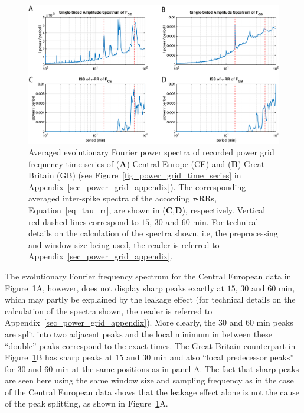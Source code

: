 \documentclass[entropy,article,accept,pdftex,moreauthors]{Definitions/mdpi}
\begin{document}
\begin{figure}[H]
 \centering
 \includegraphics[width=\textwidth]{./figures/fig_power_grid_spectra}
 \caption{Averaged evolutionary Fourier power spectra of recorded power grid frequency time series of (\textbf{A}) Central Europe (CE) and (\textbf{B}) Great Britain (GB) (see 
 Figure~\ref{fig_power_grid_time_series} in Appendix~\ref{sec_power_grid_appendix}). 
 The corresponding averaged inter-spike spectra of the according $\tau$-RRs, Equation~\eqref{eq_tau_rr}, are shown in (\textbf{C},\textbf{D}), respectively. Vertical red dashed lines correspond to 
 $15$, $30$ and $60$ \si{min}. For technical details on the calculation of the spectra shown, i.e, the preprocessing and window size being used, the reader is referred to Appendix~\ref{sec_power_grid_appendix}.}  
\label{fig_power_grid_spectra}
\end{figure}

The evolutionary Fourier frequency spectrum for the Central European data in \linebreak \mbox{Figure~\ref{fig_power_grid_spectra}A}, however, does not display sharp peaks exactly at $15$, $30$ and $60$ \si{min}, which may partly 
be explained by the leakage effect (for technical details on the calculation of 
the spectra shown, the reader is referred to Appendix~\ref{sec_power_grid_appendix}). More clearly, the $30$ and $60$ \si{min} 
peaks are split into two adjacent peaks and the local minimum in between these ``double''-peaks correspond to the exact times. The Great Britain counterpart in Figure~\ref{fig_power_grid_spectra}B 
has sharp peaks at $15$ and $30$ \si{min} and also ``local predecessor peaks'' for $30$ and $60$ \si{min} at the same positions as in panel A. 
The fact that sharp peaks are seen here using the same window size and sampling frequency as in the case of the Central European data shows that the leakage effect alone is not the cause of 
the peak splitting, as shown in Figure~\ref{fig_power_grid_spectra}A.
\end{document}
